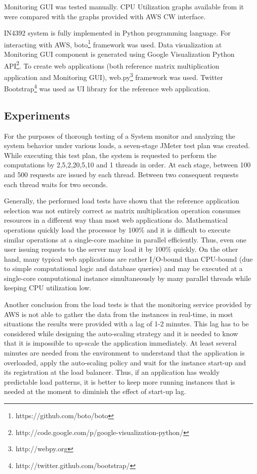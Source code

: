 \documentclass[conference]{IEEEtran}
\begin{document}
Monitoring GUI was tested manually. CPU Utilization graphs available from it were compared with the graphs provided with AWS CW interface.

IN4392 system is fully implemented in Python programming language. For interacting with AWS, boto\footnote{https://github.com/boto/boto} framework was used. Data visualization at Monitoring GUI component is generated using Google Visualization Python API\footnote{http://code.google.com/p/google-visualization-python/}. To create web applications (both reference matrix multiplication application and Monitoring GUI), web.py\footnote{http://webpy.org} framework was used. Twitter Bootstrap\footnote{http://twitter.github.com/bootstrap/} was used as UI library for the reference web application.

\subsection{Experiments}

For the purposes of thorough testing of a System monitor and analyzing the system behavior under various loads, a seven-stage JMeter test plan was created. While executing this test plan, the system is requested to perform the computations by 2,5,2,20,5,10 and 1 threads in order. At each stage, between 100 and 500 requests are issued by each thread. Between two consequent requests each thread waits for two seconds.

Generally, the performed load tests have shown that the reference application selection was not entirely correct as matrix multiplication operation consumes resources in a different way than most web applications do. Mathematical operations quickly load the processor by 100\% and it is difficult to execute similar operations at a single-core machine in parallel efficiently. Thus, even one user issuing requests to the server may load it by 100\% quickly. On the other hand, many typical web applications are rather I/O-bound than CPU-bound (due to simple computational logic and database queries) and may be executed at a single-core computational instance simultaneously by many parallel threads while keeping CPU utilization low.

Another conclusion from the load tests is that the monitoring service provided by AWS is not able to gather the data from the instances in real-time, in most situations the results were provided with a lag of 1-2 minutes. This lag has to be considered while designing the auto-scaling strategy and it is needed to know that it is impossible to up-scale the application immediately. At least several minutes are needed from the environment to understand that the application is overloaded, apply the auto-scaling policy and wait for the instance start-up and its registration at the load balancer. Thus, if an application has weakly predictable load patterns, it is better to keep more running instances that is needed at the moment to diminish the effect of start-up lag.
\end{document}
